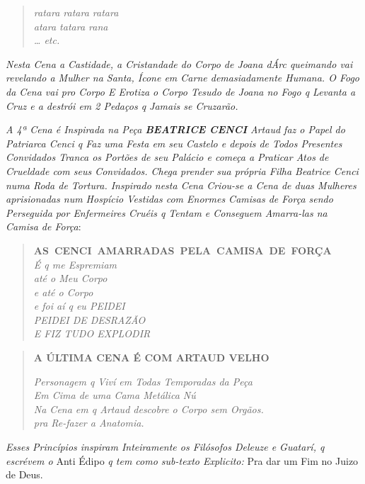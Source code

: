 \pagebreak
\mbox{}\vspace*{\fill}
\begin{verse}
\emph{ratara ratara ratara}\\
\emph{atara tatara rana}\\
\emph{\ldots{} etc.}
\end{verse}
\mbox{}\vspace*{\fill}
\pagebreak

\emph{Nesta Cena a Castidade, a Cristandade do Corpo de Joana dÁrc
queimando vai revelando a Mulher na Santa, Ícone em Carne demasiadamente
Humana. O Fogo da Cena vai pro Corpo E Erotiza o Corpo Tesudo de
Joana no Fogo q Levanta a Cruz e a destrói em 2 Pedaços q Jamais se
Cruzarão.}

\emph{A 4ª Cena é Inspirada na Peça \textbf{BEATRICE CENCI} Artaud faz o
Papel do Patriarca Cenci q Faz uma Festa em seu Castelo e depois de
Todos Presentes Convidados Tranca os Portões de seu Palácio e começa a
Praticar Atos de Crueldade com seus Convidados. Chega prender sua
própria Filha Beatrice Cenci numa Roda de Tortura. Inspirado nesta Cena
Criou-se a Cena de duas Mulheres aprisionadas num Hospício Vestidas com
Enormes Camisas de Força sendo Perseguida por Enfermeires Cruéis q
Tentam e Conseguem Amarra-las na Camisa de Força}:

\begin{verse}
\textbf{AS~CENCI~AMARRADAS~PELA~CAMISA~DE~FORÇA}\\
\emph{É q me Espremiam}\\
\emph{até o Meu Corpo}\\
\emph{e até o Corpo}\\ \EP[2]
\emph{e foi aí q eu PEIDEI}\\
\emph{PEIDEI DE DESRAZÃO}\\
\emph{E FIZ TUDO EXPLODIR}
\end{verse}

\begin{verse}
\textbf{A ÚLTIMA CENA É COM ARTAUD VELHO}

\emph{Personagem q Viví em Todas Temporadas da Peça}\\
\emph{Em Cima de uma Cama Metálica Nú}\\
\emph{Na Cena em q Artaud descobre o Corpo sem Orgãos.}\\
\emph{pra Re-fazer a Anatomia.}
\end{verse}

\emph{Esses Princípios inspiram Inteiramente os Filósofos Deleuze e
Guatarí, q escrévem o} Anti Édipo \emph{q tem como sub-texto Explicito:}
Pra dar um Fim no Juizo de Deus.

